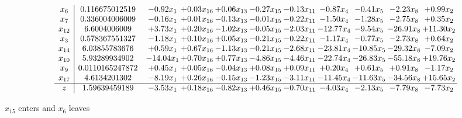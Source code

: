 \documentclass[9pt]{article}
\begin{document}
 \[\begin{array}{c| c c@{\hskip 2pt} c@{\hskip 2pt} c@{\hskip 2pt} c@{\hskip 2pt} c@{\hskip 2pt} c@{\hskip 2pt} c@{\hskip 2pt} c@{\hskip 2pt} c@{\hskip 2pt} }
 x_{6}   &  0.116675012519 & -0.92 x_{1} & +  0.03 x_{16} & +  0.06 x_{13} & -0.27 x_{15} & -0.13 x_{11} & -0.87 x_{4} & -0.41 x_{5} & -2.23 x_{8} & +  0.99 x_{2}\\
 x_{7}   &  0.336004006009 & -0.16 x_{1} & +  0.01 x_{16} & -0.13 x_{13} & -0.01 x_{15} & -0.22 x_{11} & -1.50 x_{4} & -1.28 x_{5} & -2.75 x_{8} & +  0.35 x_{2}\\
 x_{12}   &  6.6004006009 & +  3.73 x_{1} & +  0.20 x_{16} & -1.02 x_{13} & -0.05 x_{15} & -2.03 x_{11} & -12.77 x_{4} & -9.54 x_{5} & -26.91 x_{8} & + 11.30 x_{2}\\
 x_{3}   &  0.578367551327 & -1.18 x_{1} & +  0.10 x_{16} & +  0.05 x_{13} & -0.21 x_{15} & -0.22 x_{11} & -1.17 x_{4} & -0.77 x_{5} & -2.73 x_{8} & +  0.64 x_{2}\\
 x_{14}   &  6.03855783676 & +  0.59 x_{1} & +  0.67 x_{16} & -1.13 x_{13} & -0.21 x_{15} & -2.68 x_{11} & -23.81 x_{4} & -10.85 x_{5} & -29.32 x_{8} & -7.09 x_{2}\\
 x_{10}   &  5.93289934902 & -14.04 x_{1} & +  0.70 x_{16} & +  0.77 x_{13} & -4.86 x_{15} & -4.46 x_{11} & -22.74 x_{4} & -26.83 x_{5} & -55.18 x_{8} & + 19.76 x_{2}\\
 x_{9}   &  0.0110165247872 & +  0.45 x_{1} & +  0.05 x_{16} & -0.04 x_{13} & +  0.08 x_{15} & +  0.09 x_{11} & +  0.20 x_{4} & +  0.61 x_{5} & +  0.91 x_{8} & -1.17 x_{2}\\
 x_{17}   &  4.6134201302 & -8.19 x_{1} & +  0.26 x_{16} & -0.15 x_{13} & -1.23 x_{15} & -3.11 x_{11} & -11.45 x_{4} & -11.63 x_{5} & -34.56 x_{8} & + 15.65 x_{2}\\
\hline
z    &  1.59639459189 & -3.53 x_{1} & +  0.18 x_{16} & -0.82 x_{13} & +  0.46 x_{15} & -0.70 x_{11} & -4.03 x_{4} & -2.13 x_{5} & -7.79 x_{8} & -7.73 x_{2}\\
\end{array}\]


 $ x_{15} $ enters and $ x_{6} $ leaves 
\end{document}

